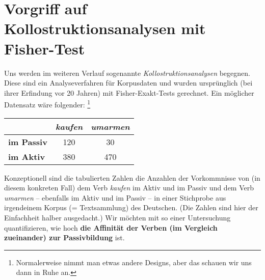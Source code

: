 \section{Vorgriff auf Kollostruktionsanalysen mit Fisher-Test}

Uns werden im weiteren Verlauf sogenannte \textit{Kollostruktionsanalysen} begegnen.
Diese sind ein Analyseverfahren für Korpusdaten und wurden ursprünglich (bei ihrer Erfindung vor 20 Jahren) mit Fisher-Exakt-Tests gerechnet.
Ein möglicher Datensatz wäre folgender:%
\footnote{Normalerweise nimmt man etwas andere Designs, aber das schauen wir uns dann in Ruhe an.}

\begin{center}
\begin{tabular}[h]{|l|c|c|}
  \cline{2-3}
  \multicolumn{1}{c|}{} & \textbf{\textit{kaufen}} & \textbf{\textit{umarmen}} \\\hline
  \textbf{im Passiv} & 120 & 30 \\\hline
  \textbf{im Aktiv} & 380 & 470 \\\hline
\end{tabular}
\end{center}

Konzeptionell sind die tabulierten Zahlen die Anzahlen der Vorkommnisse von (in diesem konkreten Fall) dem Verb \textit{kaufen} im Aktiv und im Passiv und dem Verb \textit{umarmen} -- ebenfalls im Aktiv und im Passiv -- in einer Stichprobe aus irgendeinem Korpus (= Textsammlung) des Deutschen.
(Die Zahlen sind hier der Einfachheit halber ausgedacht.)
Wir möchten mit so einer Untersuchung quantifizieren, wie hoch \textbf{die Affinität der Verben (im Vergleich zueinander) zur Passivbildung} ist.


